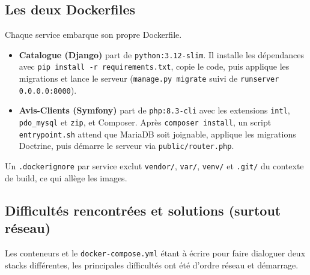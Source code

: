 \documentclass[11pt,a4paper]{article}
\begin{document}
\subsection{Les deux Dockerfiles}

Chaque service embarque son propre Dockerfile.

\begin{itemize}
  \item \textbf{Catalogue (Django)} part de \texttt{python:3.12-slim}. Il installe les dépendances avec \texttt{pip install -r requirements.txt}, copie le code, puis applique les migrations et lance le serveur (\texttt{manage.py migrate} suivi de \texttt{runserver 0.0.0.0:8000}).
  \item \textbf{Avis-Clients (Symfony)} part de \texttt{php:8.3-cli} avec les extensions \texttt{intl}, \texttt{pdo\_mysql} et \texttt{zip}, et Composer. Après \texttt{composer install}, un script \texttt{entrypoint.sh} attend que MariaDB soit joignable, applique les migrations Doctrine, puis démarre le serveur via \texttt{public/router.php}.
\end{itemize}

Un \texttt{.dockerignore} par service exclut \texttt{vendor/}, \texttt{var/}, \texttt{venv/} et \texttt{.git/} du contexte de build, ce qui allège les images.

\subsection{Difficultés rencontrées et solutions (surtout réseau)}

Les conteneurs et le \texttt{docker-compose.yml} étant à écrire pour faire dialoguer deux stacks différentes, les principales difficultés ont été d'ordre réseau et démarrage.
\end{document}
